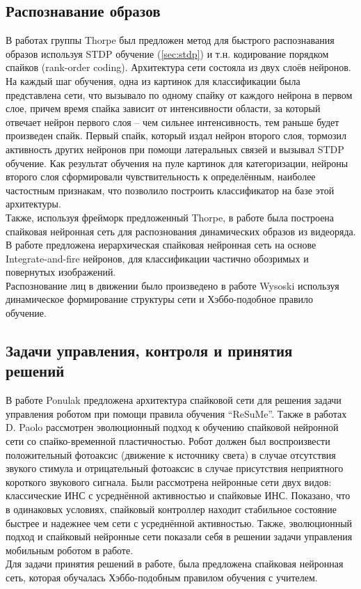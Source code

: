 \documentclass[a4paper,10pt]{article}
\begin{document}
\subsection{Распознавание образов}
\indent В работах группы Thorpe\cite{thorpe2001spike,guyonneau2004temporal,perrinet2004sparse} был предложен метод для быстрого распознавания образов используя STDP обучение (\ref{sec:stdp}) и т.н. кодирование порядком спайков (rank-order coding). Архитектура сети состояла из двух слоёв нейронов. На каждый шаг обучения, одна из картинок для классификации была представлена сети, что вызывало по одному спайку от каждого нейрона в первом слое, причем время спайка зависит от интенсивности области, за который отвечает нейрон первого слоя -- чем сильнее интенсивность, тем раньше будет произведен спайк. Первый спайк, который издал нейрон второго слоя, тормозил активность других нейронов при помощи латеральных связей и вызывал STDP обучение. Как результат обучения на пуле картинок для категоризации, нейроны второго слоя сформировали чувствительность к определённым, наиболее частостным признакам, что позволило построить классификатор на базе этой архитектуры.\\
\indent Также, используя фрейморк предложенный Thorpe, в работе\cite{kornprobst2005could} была построена спайковая нейронная сеть для распознования динамических образов из видеоряда. В работе\cite{shin2010recognition} предложена иерархическая спайковая нейронная сеть на основе Integrate-and-fire нейронов, для классификации частично обозримых и повернутых изображений.\\
\indent Распознование лиц в движении было произведено в работе Wysoski\cite{wysoski2008fast} используя динамическое формирование структуры сети и Хэббо-подобное правило обучение.
\subsection{Задачи управления, контроля и принятия решений}
\indent В работе Ponulak\cite{ponulak2006resume} предложена архитектура спайковой сети для решения задачи управления роботом при помощи правила обучения ``ReSuMe''. Также в работах D. Paolo \cite{paolo2003a, paolo2003b} рассмотрен эволюционный подход к обучению спайковой нейронной сети со спайко-временной пластичностью. Робот должен был воспроизвести положительный фотоаксис (движение к источнику света) в случае отсутствия звукого стимула и отрицательный фотоаксис в случае присутствия неприятного короткого звукового сигнала. Были рассмотрена нейронные сети двух видов: классические ИНС с усреднённой активностью и спайковые ИНС. Показано, что в одинаковых условиях, спайковый контроллер находит стабильное состояние быстрее и надежнее чем сети с усреднённой активностью. Также, эволюционный подход и спайковый нейронные сети показали себя в решении задачи управления мобильным роботом в работе\cite{trhan2012application}.\\
\indent Для задачи принятия решений в работе\cite{glackin2008implementing}, была предложена спайковая нейронная сеть, которая обучалась Хэббо-подобным правилом обучения с учителем. 
\end{document}
